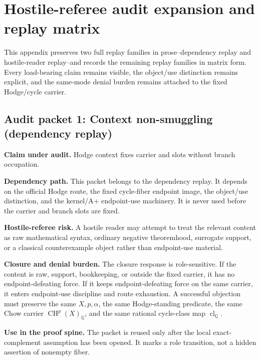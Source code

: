 \documentclass[11pt]{article}
\newcommand{\QQ}{\mathbb{Q}}
\newcommand{\CH}{\operatorname{CH}}
\newcommand{\clQ}{\operatorname{cl}_{\QQ}}
\begin{document}
\section{Hostile-referee audit expansion and replay matrix}\label{app:hostile-audit}


This appendix preserves two full replay families in prose--dependency replay and hostile-reader replay--and records the remaining replay families in matrix form. Every load-bearing claim remains visible, the object/use distinction remains explicit, and the same-mode denial burden remains attached to the fixed Hodge/cycle carrier.


\subsection{Audit packet 1: Context non-smuggling (dependency replay)}


\par\noindent\textbf{Claim under audit.} Hodge context fixes carrier and slots without branch occupation.


\par\noindent\textbf{Dependency path.} This packet belongs to the dependency replay. It depends on the official Hodge route, the fixed cycle-fiber endpoint image, the object/use distinction, and the kernel/A+ endpoint-use machinery. It is never used before the carrier and branch slots are fixed.


\par\noindent\textbf{Hostile-referee risk.} A hostile reader may attempt to treat the relevant content as raw mathematical syntax, ordinary negative theoremhood, surrogate support, or a classical counterexample object rather than endpoint-use material.


\par\noindent\textbf{Closure and denial burden.} The closure response is role-sensitive. If the content is raw, support, bookkeeping, or outside the fixed carrier, it has no endpoint-defeating force. If it keeps endpoint-defeating force on the same carrier, it enters endpoint-use discipline and route exhaustion. A successful objection must preserve the same $X,p,\alpha$, the same Hodge-standing predicate, the same Chow carrier $\CH^p(X)_\QQ$, and the same rational cycle-class map $\clQ$.


\par\noindent\textbf{Use in the proof spine.} The packet is reused only after the local exact-complement assumption has been opened. It marks a role transition, not a hidden assertion of nonempty fiber.
\end{document}
